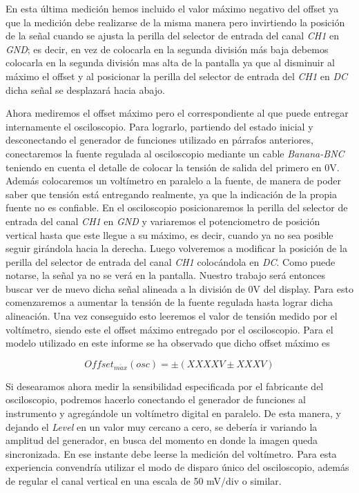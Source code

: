 \documentclass{article}
\begin{document}
\noindent En esta última medición hemos incluido el valor máximo negativo del offset ya que la medición debe realizarse de la misma manera pero invirtiendo la posición de la señal cuando se ajusta la perilla del selector de entrada del canal \textit{CH1} en \textit{GND}; es decir, en vez de colocarla en la segunda división más baja debemos colocarla en la segunda división mas alta de la pantalla ya que al disminuir al máximo el offset y al posicionar la perilla del selector de entrada del \textit{CH1} en \textit{DC} dicha señal se desplazará hacia abajo.
	\par
	Ahora mediremos el offset máximo pero el correspondiente al que puede entregar internamente el osciloscopio. Para lograrlo, partiendo del estado inicial y desconectando el generador de funciones utilizado en párrafos anteriores, conectaremos la fuente regulada al osciloscopio mediante un cable \textit{Banana-BNC} teniendo en cuenta el detalle de colocar la tensión de salida del primero en 0V. Además colocaremos un voltímetro en paralelo a la fuente, de manera de poder saber que tensión está entregando realmente, ya que la indicación de la propia fuente no es confiable. En el osciloscopio posicionaremos la perilla del selector de entrada del canal \textit{CH1} en \textit{GND} y variaremos el potenciometro de posición vertical hasta que este llegue a su máximo, es decir, cuando ya no sea posible seguir girándola hacia la derecha. Luego volveremos a modificar la posición de la perilla del selector de entrada del canal \textit{CH1} colocándola en \textit{DC}. Como puede notarse, la señal ya no se verá en la pantalla. Nuestro trabajo será entonces buscar ver de nuevo dicha señal alineada a la división de 0V del display. Para esto comenzaremos a aumentar la tensión de la fuente regulada hasta lograr dicha alineación. Una vez conseguido esto leeremos el valor de tensión medido por el voltímetro, siendo este el offset máximo entregado por el osciloscopio. Para el modelo utilizado en este informe se ha observado que dicho offset máximo es 

\begin{equation*}
	Offset_{m\acute{a}x}(osc) = \pm (XXXXV \pm XXXV)
\end{equation*}
\medskip


	Si desearamos ahora medir la sensibilidad especificada por el fabricante del osciloscopio, podremos hacerlo conectando el generador de funciones al instrumento y agregándole un voltímetro digital en paralelo. De esta manera, y dejando el \textit{Level} en un valor muy cercano a cero, se debería ir variando la amplitud del generador, en busca del momento en donde la imagen queda sincronizada. En ese instante debe leerse la medición del voltímetro. Para esta experiencia convendría utilizar el modo de disparo único del osciloscopio, además de regular el canal vertical en una escala de 50 mV/div o similar.
\bigskip
\end{document}
